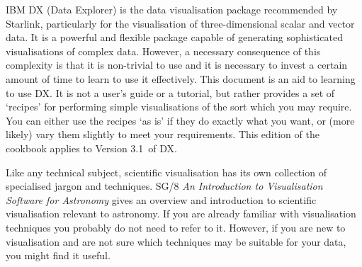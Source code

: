 \documentclass[twoside,11pt]{article}
\newcommand{\DXversion}{3.1~}
\newcommand{\xref}[3]{#1}
\begin{document}
IBM DX (Data Explorer) is the data visualisation package recommended by
Starlink, particularly for the visualisation of three-dimensional
scalar and vector data. It is a powerful and flexible package capable
of generating sophisticated visualisations of complex data. However, a
necessary consequence of this complexity is that it is non-trivial to
use and it is necessary to invest a certain amount of time to learn to
use it effectively. This document is an aid to learning to use DX. It
is not a user's guide or a tutorial, but rather provides a set of
`recipes' for performing simple visualisations of the sort which
you may require. You can either use the recipes `as is' if they do
exactly what you want, or (more likely) vary them slightly to meet
your requirements. This edition of the cookbook applies to Version
\DXversion of DX.

Like any technical subject, scientific visualisation has its own
collection of specialised jargon and techniques. SG/8 \xref{{\it An
Introduction to Visualisation Software for Astronomy}}{sg8}{}\cite{SG8}
gives an overview and introduction to scientific visualisation relevant
to astronomy. If you are already familiar with visualisation techniques
you probably do not need to refer to it. However, if you are new to
visualisation and are not sure which techniques may be suitable for your
data, you might find it useful.
\end{document}

